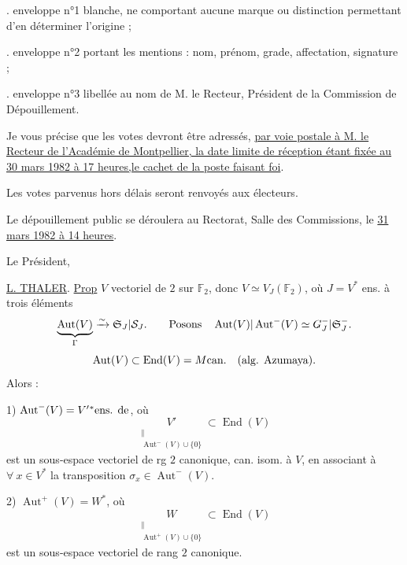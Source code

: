 \hspace*{2em}. enveloppe n°1 blanche, ne comportant aucune marque ou distinction permettant d'en déterminer l'origine ;

\hspace*{2em}. enveloppe n°2 portant les mentions : nom, prénom, grade, affectation, signature ;

\hspace*{2em}. enveloppe n°3 libellée au nom de M. le Recteur, Président de la Commission de Dépouillement.

Je vous précise que les votes devront être adressés, \uline{par voie postale à M. le Recteur de l'Académie de Montpellier, la date limite de réception étant fixée au 30 mars 1982 à 17 heures,le cachet de la poste faisant foi}.

Les votes parvenus hors délais seront renvoyés aux électeurs.

Le dépouillement public se déroulera au Rectorat, Salle des Commissions, le \uline{31 mars 1982 à 14 heures}.

Le Président,


\uline{L. THALER}.
\uline{Prop} $V$ vectoriel de  $2$ sur $\mathbb F_2$, donc $V\simeq V_J(\mathbb F_2)$, où $J=V^*$ ens. à trois éléments
\[
\underbrace{\operatorname{Aut}(V)}_{\Gamma}\xrightarrow{\sim}\mathfrak S_J|\mathcal S_J.
\qquad\text{Posons}\quad\operatorname{Aut}(V)|\operatorname{Aut}^-(V)\simeq G_J^-|\mathfrak S_J^-.
\]
\[
\operatorname{Aut}(V)\subset\operatorname{End}(V)=M\text{can.}\quad(\text{alg. Azumaya}).
\]
Alors :

1) $\operatorname{Aut}^-(V)=V'{}^*\text{ens. de}$, où
\[
\underset{\substack{\Vert\\\operatorname{Aut}^-(V)\cup\{0\}}}{V'}\subset\operatorname{End}(V)
\]
est un sous-espace vectoriel de rg $2$ canonique, can. isom. à $V$, en associant à $\forall\ x\in V^*$ la transposition $\sigma_x\in\operatorname{Aut}^-(V)$.

2) $\operatorname{Aut}^+(V)=W^*$, où
\[
\underset{\substack{\Vert\\\operatorname{Aut}^+(V)\cup\{0\}}}{W}\subset\operatorname{End}(V)
\]
est un sous-espace vectoriel de rang $2$ canonique.

